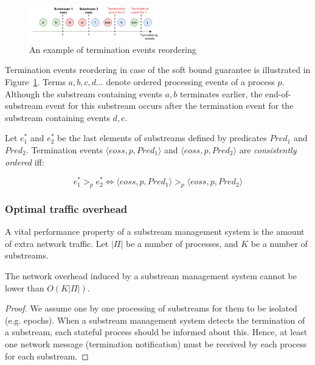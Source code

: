 \begin{figure}[htbp]
  \centering
  \includegraphics[width=0.50\textwidth]{pics/notifications-reordering.pdf}
  \caption{An example of termination events reordering}
  \label{notifications_reordering}
\end{figure}

Termination events reordering in case of the soft bound guarantee is illustrated in Figure~\ref{notifications_reordering}. Terms $a,b,c,d...$ denote ordered processing events of a process $p$. Although the substream containing events $a,b$ terminates earlier, the end-of-substream event for this substream occurs after the termination event for the substream containing events $d,e$. 

Let $e^{*}_1$ and $e^{*}_2$ be the last elements of substreams defined by predicates $Pred_1$ and $Pred_2$. Termination events $\langle eoss, p, Pred_1\rangle$ and $\langle eoss, p, Pred_2\rangle$ are {\em consistently ordered} iff:

\begin{equation}
e^{*}_1 >_p e^{*}_2 \Leftrightarrow \langle eoss, p, Pred_1\rangle >_p \langle eoss, p, Pred_2\rangle
\end{equation}

\subsubsection{Optimal traffic overhead}

A vital performance property of a substream management system is the amount of extra network traffic. Let $|\Pi|$ be a number of processes, and $K$ be a number of substreams. 

\begin{lemma}
The network overhead induced by a substream management system cannot be lower than $O(K|\Pi|)$. 
\end{lemma}
\begin{proof}
We assume one by one processing of substreams for them to be isolated (e.g. epochs). When a substream management system detects the termination of a substream, each stateful process should be informed about this. Hence, at least one network message (termination notification) must be received by each process for each substream.
\end{proof}

